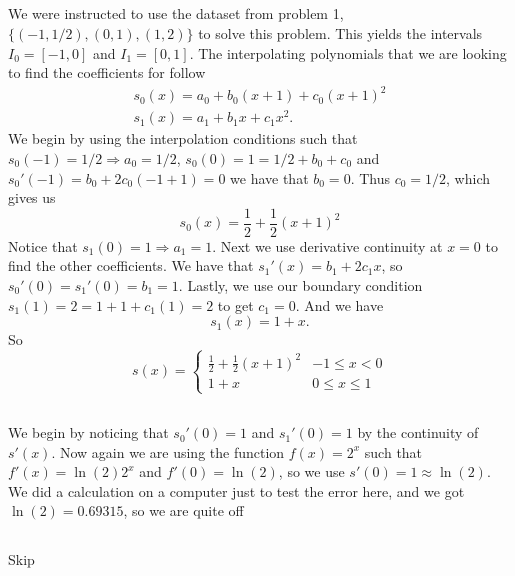 \documentclass[12pt]{amsart}
\begin{document}
\begin{onehalfspace}
        \subsection{}
        We were instructed to use the dataset from problem 1, $\{(-1,1/2), (0,1), (1,2)\}$ to solve this problem.
        This yields the intervals $I_0=[-1,0]$ and $I_1=[0,1]$.
        The interpolating polynomials that we are looking to find the coefficients for follow
        \begin{gather*}
            s_0(x) = a_0 + b_0(x+1)+c_0(x+1)^2\\
            s_1(x) = a_1 + b_1 x + c_1 x^2.
        \end{gather*}
        We begin by using the interpolation conditions such that $s_0(-1) = 1/2 \Rightarrow a_0=1/2$,
        $s_0(0) = 1 = 1/2 + b_0 + c_0$ and $s_0'(-1) = b_0 + 2c_0(-1+1) = 0$ we have that $b_0 = 0$.
        Thus $c_0 = 1/2$, which gives us
        \[
            s_0(x) = \frac{1}{2} + \frac{1}{2}(x+1)^2
        \]
        Notice that $s_1(0) = 1 \Rightarrow a_1 = 1$.
        Next we use derivative continuity at $x=0$ to find the other coefficients.
        We have that $s_1'(x) = b_1 + 2c_1 x$, so $s_0'(0) = s_1'(0) = b_1 = 1$.
        Lastly, we use our boundary condition $s_1(1) = 2 = 1 + 1 + c_1(1) = 2$ to get $c_1 = 0$.
        And we have
        \[
            s_1(x) = 1 + x.
        \]
        So
        \[
            s(x) =
            \begin{cases}
                \frac{1}{2} + \frac{1}{2}(x+1)^2 & -1\le x < 0\\
                1+x & 0\le x \le 1
            \end{cases}
        \]

        \subsection{}
        We begin by noticing that $s_0'(0) = 1$ and $s_1'(0) = 1$ by the continuity of $s'(x)$.
        Now again we are using the function $f(x)=2^x$ such that $f'(x) = \ln(2) 2^x$ and $f'(0) = \ln(2)$, so
        we use $s'(0) = 1 \approx \ln(2)$.
        We did a calculation on a computer just to test the error here, and we got $\ln(2)=0.69315$, so we
        are quite off

        \subsection{}
        Skip


\end{onehalfspace}
\end{document}
